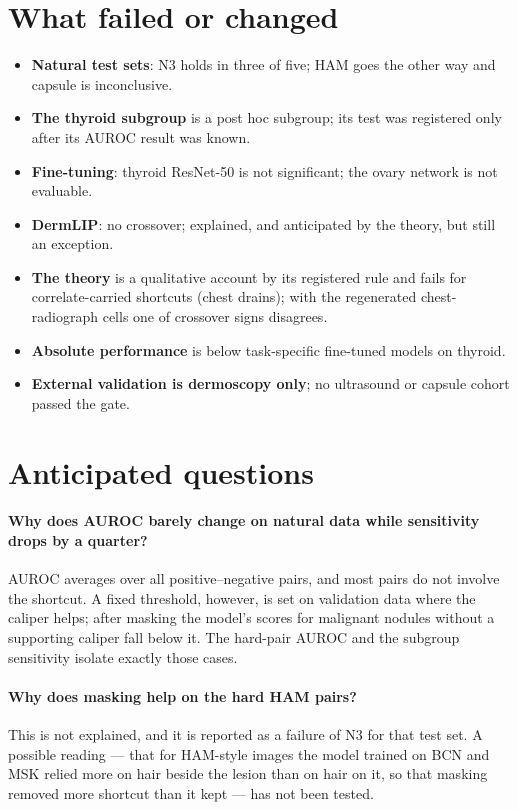 \section{What failed or changed}
\begin{itemize}[leftmargin=*]\itemsep1pt
\item \textbf{Natural test sets}: N3 holds in three of five; HAM goes the other way and capsule is inconclusive.
\item \textbf{The thyroid subgroup} is a post hoc subgroup; its test was registered only after its AUROC result was known.
\item \textbf{Fine-tuning}: thyroid ResNet-50 is not significant; the ovary network is not evaluable.
\item \textbf{DermLIP}: no crossover; explained, and anticipated by the theory, but still an exception.
\item \textbf{The theory} is a qualitative account by its registered rule and fails for correlate-carried shortcuts (chest
drains); with the regenerated chest-radiograph cells one of \sFiveTCxrSignN{} crossover signs disagrees.
\item \textbf{Absolute performance} is below task-specific fine-tuned models on thyroid.
\item \textbf{External validation is dermoscopy only}; no ultrasound or capsule cohort passed the gate.
\end{itemize}

\section{Anticipated questions}
\paragraph{Why does AUROC barely change on natural data while sensitivity drops by a quarter?} AUROC averages over all
positive--negative pairs, and most pairs do not involve the shortcut. A fixed threshold, however, is set on validation
data where the caliper helps; after masking the model's scores for malignant nodules without a supporting caliper fall
below it. The hard-pair AUROC and the subgroup sensitivity isolate exactly those cases.
\paragraph{Why does masking help on the hard HAM pairs?} This is not explained, and it is reported as a failure of N3
for that test set. A possible reading --- that for HAM-style images the model trained on BCN and MSK relied more on hair
beside the lesion than on hair on it, so that masking removed more shortcut than it kept --- has not been tested.

